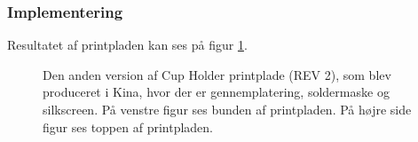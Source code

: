 \documentclass[Rapport/Rapport_main.tex]{subfiles}
\begin{document}
\subsubsection{Implementering}
Resultatet af printpladen kan ses på figur \ref{fig:CupHolderRev2}.
\begin{figure}[H]
\centering
{}
\caption{Den anden version af Cup Holder printplade (REV 2), som blev produceret i Kina, hvor der er gennemplatering, soldermaske og silkscreen. På venstre figur ses bunden af printpladen. På højre side figur ses toppen af printpladen.}
\label{fig:CupHolderRev2}
\end{figure}
\end{document}
